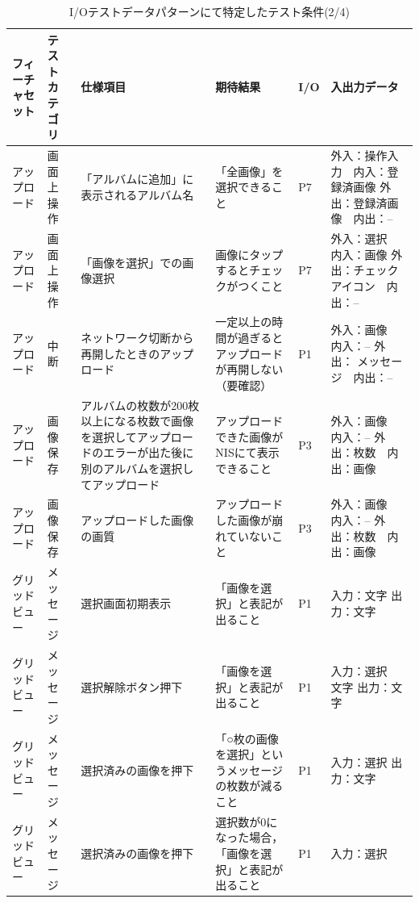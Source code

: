 \begin{table}[htbp]

  \scriptsize
  \centering
  \caption{I/Oテストデータパターンにて特定したテスト条件(2/4)}
  \begin{tabular}{|p{8em}|p{7em}|p{9em}|p{9em}|p{3em}|p{12em}|}
\cline{1-6}   フィーチャセット & テストカテゴリ  & 仕様項目 & 期待結果  & I/O   & 入出力データ \bigstrut\\
    \hline
    \hline
    アップロード & 画面上操作 & \multicolumn{1}{p{7.5em}|}{「アルバムに追加」に表示されるアルバム名} & 「全画像」を選択できること & P7    & 外入：操作入力　内入：登録済画像
外出：登録済画像　内出：-- \bigstrut\\
    \hline
    アップロード & 画面上操作 & 「画像を選択」での画像選択 & 画像にタップするとチェックがつくこと & P7    & 外入：選択　内入：画像
外出：チェックアイコン　内出：-- \bigstrut\\
    \hline
    アップロード & 中断    & \multicolumn{1}{p{7.5em}|}{ネットワーク切断から再開したときのアップロード} & 一定以上の時間が過ぎるとアップロードが再開しない（要確認） & P1    & 外入：画像　内入：--
外出： メッセージ　内出：-- \bigstrut\\
    \hline
    アップロード & 画像保存  & \multicolumn{1}{p{7.5em}|}{アルバムの枚数が200枚以上になる枚数で画像を選択してアップロードのエラーが出た後に別のアルバムを選択してアップロード} & アップロードできた画像がNISにて表示できること & P3    & 外入：画像　内入：--
外出：枚数　内出：画像 \bigstrut\\
    \hline
    アップロード & 画像保存 & \multicolumn{1}{p{7.5em}|}{アップロードした画像の画質} & アップロードした画像が崩れていないこと & P3    & 外入：画像　内入：--
外出：枚数　内出：画像 \bigstrut\\
    \hline
    グリッドビュー & メッセージ & 選択画面初期表示 & 「画像を選択」と表記が出ること & P1    & 入力：文字
出力：文字 \bigstrut\\
    \hline
    グリッドビュー & メッセージ & 選択解除ボタン押下 & 「画像を選択」と表記が出ること & P1    & 入力：選択　文字
出力：文字 \bigstrut\\
    \hline
    グリッドビュー & メッセージ & \multicolumn{1}{p{7.5em}|}{選択済みの画像を押下} & 「○枚の画像を選択」というメッセージの枚数が減ること & P1    & 入力：選択
出力：文字 \bigstrut\\
    \hline
    グリッドビュー & メッセージ & \multicolumn{1}{p{7.5em}|}{選択済みの画像を押下} & 選択数が0になった場合，「画像を選択」と表記が出ること & P1    & 入力：選択

\end{tabular}
\end{table}
